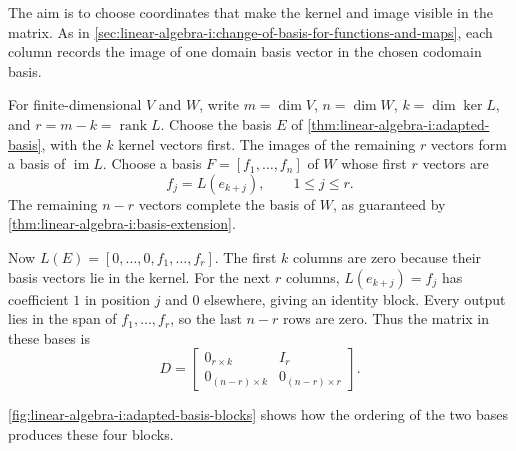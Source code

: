 The aim is to choose coordinates that make the kernel and image visible
in the matrix.
As in \autoref{sec:linear-algebra-i:change-of-basis-for-functions-and-maps},
each column records the image of one domain basis vector in the chosen
codomain basis.

For finite-dimensional \(V\) and \(W\), write
\(m=\dim V\), \(n=\dim W\), \(k=\dim\ker L\), and
\(r=m-k=\operatorname{rank}L\). Choose the basis \(E\) of
\autoref{thm:linear-algebra-i:adapted-basis}, with the \(k\) kernel
vectors first. The images of the remaining \(r\) vectors form a basis
of \(\operatorname{im}L\). Choose a basis
\(F=[f_1,\ldots,f_n]\) of \(W\) whose first \(r\) vectors are
\[
  f_j=L(e_{k+j}),\qquad 1\leq j\leq r.
\]
The remaining \(n-r\) vectors complete the basis of \(W\), as guaranteed
by \autoref{thm:linear-algebra-i:basis-extension}.

Now \(L(E)=[0,\ldots,0,f_1,\ldots,f_r]\). The first \(k\) columns
are zero because their basis vectors lie in the kernel. For the next
\(r\) columns, \(L(e_{k+j})=f_j\) has coefficient \(1\) in position
\(j\) and \(0\) elsewhere, giving an identity block. Every output lies
in the span of \(f_1,\ldots,f_r\), so the last \(n-r\) rows are zero.
Thus the matrix in these bases is
\begin{equation}
  D=
  \begin{bmatrix}
    0_{r\times k}&I_r\\
    0_{(n-r)\times k}&0_{(n-r)\times r}
  \end{bmatrix}.
  \label{eq:linear-algebra-i:kernel-first-normal-form}
\end{equation}

\autoref{fig:linear-algebra-i:adapted-basis-blocks} shows how the
ordering of the two bases produces these four blocks.

